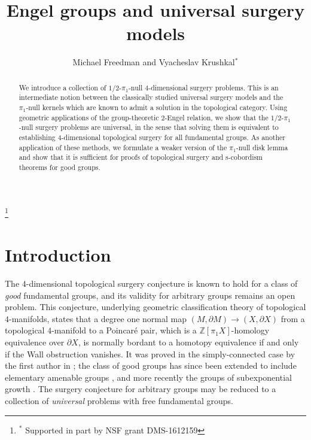\documentclass[12pt]{amsart}
\theoremstyle{definition}
\theoremstyle{remark}
\numberwithin{equation}{section}
\theoremstyle{plain}
\theoremstyle{definition}
\numberwithin{figure}{section}
\begin{document}
\title[Engel groups and universal surgery models]{Engel groups and universal surgery models}
\author{Michael Freedman and Vyacheslav Krushkal$^*$}

\address{Microsoft Station Q, University of California, Santa Barbara, CA 93106-6105, and
Department of Mathematics, University of California, Santa Barbara, CA 93106
}
\address{Department of Mathematics, University of Virginia, Charlottesville, VA 22904}

\thanks{$^*$ Supported in part by NSF grant DMS-1612159}


\begin{abstract}
We introduce a collection of $1/2$-${\pi}_1$-null $4$-dimensional surgery problems. This is an intermediate notion between the classically studied universal surgery models and the ${\pi}_1$-null kernels which are known to admit a solution in the topological category.
Using geometric applications of the group-theoretic $2$-Engel relation,  we show that the $1/2$-${\pi}_1$-null surgery problems are universal, in the sense that solving them is equivalent to establishing $4$-dimensional topological surgery for all fundamental groups.
As another application of these methods, we formulate a weaker version of the ${\pi}_1$-null disk lemma and show that it is sufficient for proofs of topological surgery and s-cobordism theorems for good groups.
\end{abstract}


\maketitle

\section{Introduction}
The $4$-dimensional topological surgery conjecture is known to hold for a class of {\em good} fundamental groups, and its validity for arbitrary groups remains an open problem. This conjecture, underlying geometric classification theory of topological $4$-manifolds, states that a degree one normal map $(M, \partial M)\longrightarrow (X, \partial X)$ from a topological $4$-manifold to a Poincar\'{e} pair, which is a ${\mathbb Z}[{\pi}_1 X]$-homology equivalence over $\partial X$, is normally bordant to a homotopy equivalence if and only if the Wall obstruction vanishes.   It was proved in the simply-connected case by the first author in \cite{F0}; the class of good groups has since been extended to include elementary amenable groups \cite{F1}, and more recently the groups of subexponential growth \cite{FT, KQ}. The surgery conjecture for arbitrary groups may be reduced to a collection of {\em universal} problems \cite{CF, F1} with free fundamental groups. 
\end{document}
